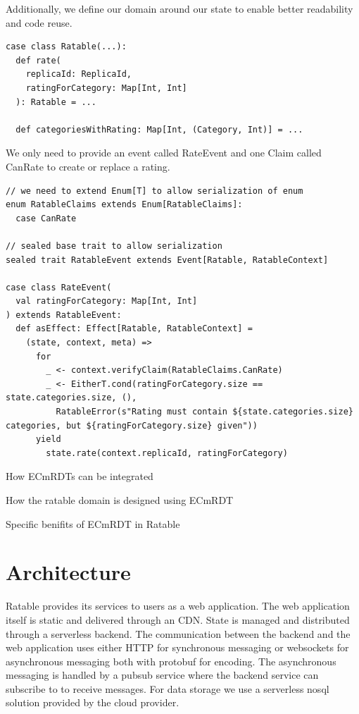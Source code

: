 \documentclass[
	ngerman,
	ruledheaders=section,   %
	class=report,		    %
	thesis={type=bachelor}, %
	accentcolor=9c,			%
	custommargins=true,    %
	marginpar=false,        %
	parskip=half-,          %
	fontsize=11pt,          %
]{tudapub}
\begin{document}
Additionally, we define our domain around our state to enable better readability and code reuse.

\begin{lstlisting}
case class Ratable(...):
  def rate(
    replicaId: ReplicaId, 
    ratingForCategory: Map[Int, Int]
  ): Ratable = ...

  def categoriesWithRating: Map[Int, (Category, Int)] = ...
\end{lstlisting}

We only need to provide an event called RateEvent and one Claim called CanRate to create or replace a rating.

\begin{lstlisting}
// we need to extend Enum[T] to allow serialization of enum
enum RatableClaims extends Enum[RatableClaims]:
  case CanRate

// sealed base trait to allow serialization
sealed trait RatableEvent extends Event[Ratable, RatableContext]

case class RateEvent(
  val ratingForCategory: Map[Int, Int]
) extends RatableEvent:
  def asEffect: Effect[Ratable, RatableContext] =
    (state, context, meta) =>
      for
        _ <- context.verifyClaim(RatableClaims.CanRate)
        _ <- EitherT.cond(ratingForCategory.size == state.categories.size, (),
          RatableError(s"Rating must contain ${state.categories.size} categories, but ${ratingForCategory.size} given"))
      yield
        state.rate(context.replicaId, ratingForCategory)
\end{lstlisting}

How ECmRDTs can be integrated 

How the ratable domain is designed using ECmRDT

Specific benifits of ECmRDT in Ratable

\chapter{Architecture}


Ratable provides its services to users as a web application. The web application itself is static and delivered through an CDN. State is managed and distributed through a serverless backend. The communication between the backend and the web application uses either HTTP for synchronous messaging or websockets for asynchronous messaging both with protobuf for encoding. The asynchronous messaging is handled by a pubsub service where the backend service can subscribe to to receive messages. For data storage we use a serverless nosql solution provided by the cloud provider.
\end{document}
